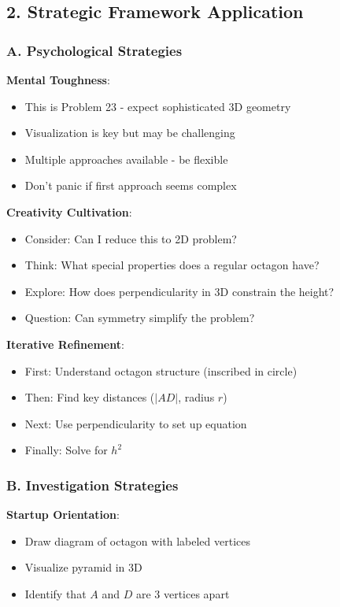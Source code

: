 \documentclass[12pt]{article}
\begin{document}
\begin{strategicbox}
\subsection*{2. Strategic Framework Application}

\subsubsection*{A. Psychological Strategies}

\textbf{Mental Toughness}:
\begin{itemize}
    \item This is Problem 23 - expect sophisticated 3D geometry
    \item Visualization is key but may be challenging
    \item Multiple approaches available - be flexible
    \item Don't panic if first approach seems complex
\end{itemize}

\textbf{Creativity Cultivation}:
\begin{itemize}
    \item Consider: Can I reduce this to 2D problem?
    \item Think: What special properties does a regular octagon have?
    \item Explore: How does perpendicularity in 3D constrain the height?
    \item Question: Can symmetry simplify the problem?
\end{itemize}

\textbf{Iterative Refinement}:
\begin{itemize}
    \item First: Understand octagon structure (inscribed in circle)
    \item Then: Find key distances ($|AD|$, radius $r$)
    \item Next: Use perpendicularity to set up equation
    \item Finally: Solve for $h^2$
\end{itemize}

\subsubsection*{B. Investigation Strategies}

\textbf{Startup Orientation}:
\begin{itemize}
    \item Draw diagram of octagon with labeled vertices
    \item Visualize pyramid in 3D
    \item Identify that $A$ and $D$ are 3 vertices apart
\end{itemize}


\end{strategicbox}
\end{document}
